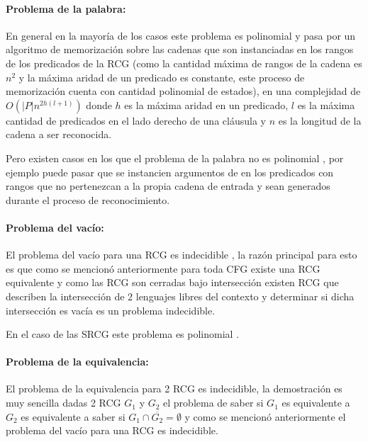 \documentclass[12pt]{article}
\begin{document}
\paragraph{Problema de la palabra:} En general en la mayoría de los casos este problema es polinomial y pasa por
un algoritmo de memorización sobre las cadenas que son instanciadas en los rangos de los predicados de la RCG \cite{mainRCGBib} (como la cantidad
máxima de rangos de la cadena es $n^2$ y la máxima aridad de un predicado es constante, este proceso de memorización cuenta
con cantidad polinomial de estados), en
una complejidad de $O(|P|n^{2h(l+1)})$ donde $h$ es la máxima aridad en un predicado, $l$ es la máxima cantidad de predicados
en el lado derecho de una cláusula y $n$ es la longitud de la cadena a ser reconocida.

Pero existen casos en los que el problema de la palabra no
es polinomial \cite{propertiesRCGBib}, por ejemplo puede pasar que se instancien argumentos de en los predicados con rangos que no pertenezcan
a la propia cadena de entrada y sean generados durante el proceso de reconocimiento.

\paragraph{Problema del vacío:} El problema del vacío para una RCG es indecidible \cite{propertiesRCGBib}, la razón principal para esto es que como se mencionó anteriormente
para toda CFG existe una RCG equivalente y como las RCG son cerradas bajo intersección existen RCG que describen
la intersección de 2 lenguajes libres del contexto y determinar si dicha intersección es vacía es un problema indecidible.

En el caso de las SRCG este problema es polinomial \cite{mainRCGBib}.

\paragraph{Problema de la equivalencia:} El problema de la equivalencia para 2 RCG es indecidible, la demostración es muy sencilla dadas 2 RCG $G_1$ y $G_2$ el problema
de saber si $G_1$ es equivalente a $G_2$ es equivalente a saber si $G_1\cap \overline{G_2}=\emptyset$ y como se mencionó anteriormente el problema del vacío para una RCG
es indecidible.
\end{document}
